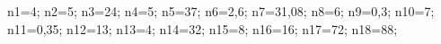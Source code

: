 \documentclass[exercice]{thedocument}%
\begin{document}
%
    \>n1=4;%
    \>n2=5;%
    \>n3=24;%
    \>n4=5;%
    \>n5=37;%
    \>n6=2,6;%
    \>n7=31,08;%
    \>n8=6;%
    \>n9=0,3;%
    \>n10=7;%
    \>n11=0,35;%
    \>n12=13;%
    \>n13=4;%
    \>n14=32;%
    \>n15=8;%
    \>n16=16;%
    \>n17=72;%
    \>n18=88;%
\end{document}
